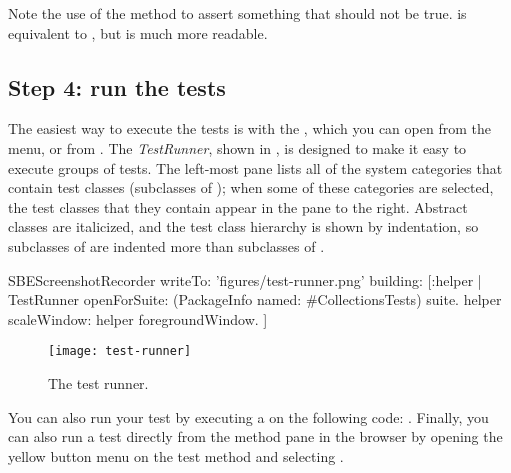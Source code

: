 \documentclass[a4paper,10pt,twoside]{book}
\begin{document}
\noindent
Note the use of the method  to assert something that should not be true.
 is equivalent to , but is much more readable.
\subsection{Step 4: run the tests}

The easiest way to execute the tests is with the \sunit {}, which you can open from the  menu, or from .
The \emph{TestRunner}, shown in , is designed to make it easy to execute groups of tests.
The left-most pane lists all of the system categories that contain test classes (\ie  subclasses of ); when some of these categories are selected, the test classes that they contain appear in the pane to the right.
Abstract classes are italicized, and the test class hierarchy is shown by indentation, so subclasses of  are indented more than subclasses of .

\begin{ExecuteSmalltalkScript}
SBEScreenshotRecorder writeTo: 'figures/test-runner.png' building: [:helper |
	TestRunner openForSuite: (PackageInfo named: #CollectionsTests) suite.
	helper scaleWindow: helper foregroundWindow.
]
\end{ExecuteSmalltalkScript}
\begin{figure}[tbh]
  \begin{center}
	\texttt{[image: test-runner]}
	\caption{The \squeak \sunit test runner.}
	\label{fig:test-runner}
  \end{center}
\end{figure}



You can also run your test by executing a  on the following code:
.
Finally, you can also run a test directly from the method pane in the browser by opening the yellow button menu on the test method and selecting .

\end{document}
